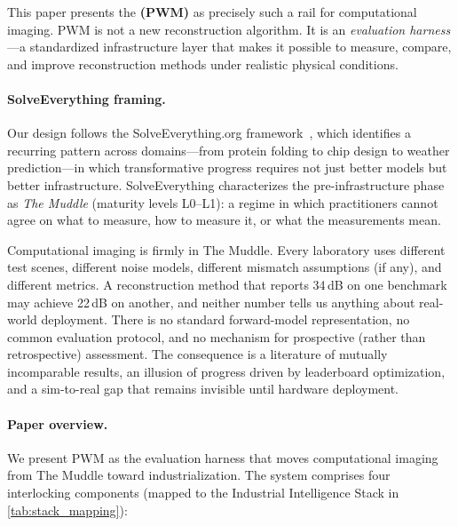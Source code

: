 This paper presents the \textbf{\pwm{} (PWM)} as precisely such a rail
for computational imaging.
PWM is not a new reconstruction algorithm.
It is an \emph{evaluation harness}---a standardized infrastructure layer
that makes it possible to measure, compare, and improve reconstruction
methods under realistic physical conditions.


\paragraph{SolveEverything framing.}
Our design follows the SolveEverything.org framework~\cite{wissner2026solveeverything},
which identifies a recurring pattern across domains---from protein
folding to chip design to weather prediction---in which transformative
progress requires not just better models but better infrastructure.
SolveEverything characterizes the pre-infrastructure phase as
\emph{The Muddle} (maturity levels L0--L1): a regime in which
practitioners cannot agree on what to measure, how to measure it, or
what the measurements mean.

Computational imaging is firmly in The Muddle.
Every laboratory uses different test scenes, different noise models,
different mismatch assumptions (if any), and different metrics.
A reconstruction method that reports 34\,dB on one benchmark may achieve
22\,dB on another, and neither number tells us anything about real-world
deployment.
There is no standard forward-model representation, no common evaluation
protocol, and no mechanism for prospective (rather than retrospective)
assessment.
The consequence is a literature of mutually incomparable results, an
illusion of progress driven by leaderboard optimization, and a
sim-to-real gap that remains invisible until hardware deployment.


\paragraph{Paper overview.}
We present PWM as the evaluation harness that moves computational
imaging from The Muddle toward industrialization.
The system comprises four interlocking components (mapped to the
Industrial Intelligence Stack in \cref{tab:stack_mapping}):

